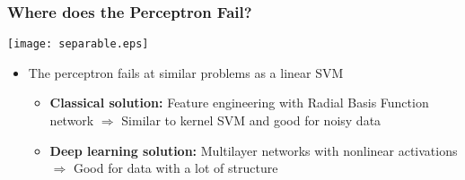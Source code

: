 %
%
%


\begin{frame}
\frametitle{Where does the Perceptron Fail?}
\begin{center}
\texttt{[image: separable.eps]}
\end{center}
\begin{itemize}
\item The perceptron fails at similar problems as a linear SVM
\begin{itemize}
\item {\bf Classical solution:} Feature engineering with
Radial Basis Function network $\Rightarrow$ Similar to kernel SVM
and good for noisy data
\item {\bf Deep learning solution:} Multilayer networks with
nonlinear activations $\Rightarrow$ Good for data with a lot of
structure
\end{itemize}
\end{itemize}
\end{frame}




